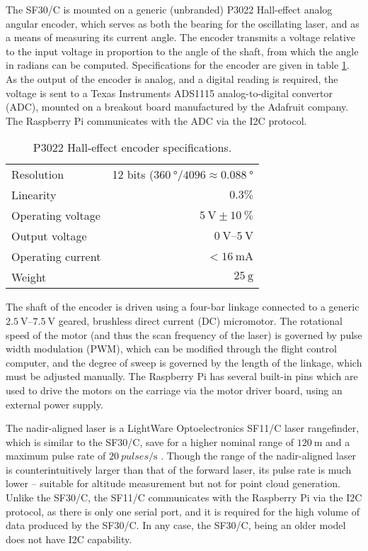 The SF30/C is mounted on a generic (unbranded) P3022 Hall-effect analog angular encoder, which serves as both the bearing for the oscillating laser, and as a means of measuring its current angle. The encoder transmits a voltage relative to the input voltage in proportion to the angle of the shaft, from which the angle in radians can be computed. Specifications for the encoder are given in table \ref{table:encoderspecs}. As the output of the encoder is analog, and a digital reading is required, the voltage is sent to a Texas Instruments ADS1115 analog-to-digital convertor (ADC), mounted on a breakout board manufactured by the Adafruit company. The Raspberry Pi communicates with the ADC via the I2C protocol.

\begin{table}
\begin{center}
\begin{tabular}{l r}
\hline
Resolution & 12 bits ($\SI{360}{\degree} / 4096 \approx \SI{0.088}{\degree}$ \\
Linearity & $0.3\percent$ \\
Operating voltage & $\SI{5}{\volt} \pm \SI{10}{\percent}$ \\
Output voltage & $\SIrange{0}{5}{\volt}$ \\
Operating current & $< \SI{16}{\milli\ampere}$  \\ 
Weight & $\SI{25}{\gram}$ \\
\hline
\end{tabular}
\end{center}
\caption{P3022 Hall-effect encoder specifications.}
\label{table:encoderspecs}
\end{table}

The shaft of the encoder is driven using a four-bar linkage connected to a generic $\SIrange{2.5}{7.5}{\volt}$ geared, brushless direct current (DC) micromotor. The rotational speed of the motor (and thus the scan frequency of the laser) is governed by pulse width modulation (PWM), which can be modified through the flight control computer, and the degree of sweep is governed by the length of the linkage, which must be adjusted manually. The Raspberry Pi has several built-in pins which are used to drive the motors on the carriage via the motor driver board, using an external power supply.

The nadir-aligned laser is a LightWare Optoelectronics SF11/C laser rangefinder, which is similar to the SF30/C, save for a higher nominal range of $\SI{120}{\metre}$ and a maximum pulse rate of $\SI{20}{pulses\per\second}$  \cite{LightWareOptoelectronics2018}. Though the range of the nadir-aligned laser is counterintuitively larger than that of the forward laser, its pulse rate is much lower -- suitable for altitude measurement but not for point cloud generation. Unlike the SF30/C, the SF11/C communicates with the Raspberry Pi via the I2C protocol, as there is only one serial port, and it is required for the high volume of data produced by the SF30/C. In any case, the SF30/C, being an older model does not have I2C capability.

